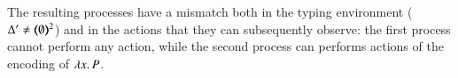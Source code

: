 
\noi The resulting processes have a mismatch both in the typing
environment ($\Delta' \not= (\!\!\langle\emptyset\rangle\!\!)^{2}$)
and in the actions that they can %
subsequently observe: the first process
cannot perform any action, while the second process
can performs actions of the encoding of $\lambda x.\,P$.

